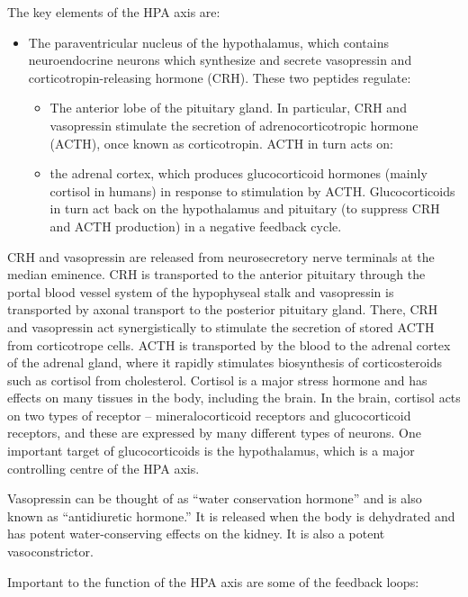 The key elements of the HPA axis are:

\begin{itemize}
\tightlist
\item
  The paraventricular nucleus of the hypothalamus, which contains neuroendocrine neurons which synthesize and secrete vasopressin and corticotropin-releasing hormone (CRH). These two peptides regulate:

  \begin{itemize}
  \tightlist
  \item
    The anterior lobe of the pituitary gland. In particular, CRH and vasopressin stimulate the secretion of adrenocorticotropic hormone (ACTH), once known as corticotropin. ACTH in turn acts on:
  \item
    the adrenal cortex, which produces glucocorticoid hormones (mainly cortisol in humans) in response to stimulation by ACTH. Glucocorticoids in turn act back on the hypothalamus and pituitary (to suppress CRH and ACTH production) in a negative feedback cycle.
  \end{itemize}
\end{itemize}

CRH and vasopressin are released from neurosecretory nerve terminals at the median eminence. CRH is transported to the anterior pituitary through the portal blood vessel system of the hypophyseal stalk and vasopressin is transported by axonal transport to the posterior pituitary gland. There, CRH and vasopressin act synergistically to stimulate the secretion of stored ACTH from corticotrope cells. ACTH is transported by the blood to the adrenal cortex of the adrenal gland, where it rapidly stimulates biosynthesis of corticosteroids such as cortisol from cholesterol. Cortisol is a major stress hormone and has effects on many tissues in the body, including the brain. In the brain, cortisol acts on two types of receptor -- mineralocorticoid receptors and glucocorticoid receptors, and these are expressed by many different types of neurons. One important target of glucocorticoids is the hypothalamus, which is a major controlling centre of the HPA axis.

Vasopressin can be thought of as ``water conservation hormone'' and is also known as ``antidiuretic hormone.'' It is released when the body is dehydrated and has potent water-conserving effects on the kidney. It is also a potent vasoconstrictor.

Important to the function of the HPA axis are some of the feedback loops:

